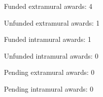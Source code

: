 \begin{veryTightItemize}
    \item Funded extramural awards: 4
    \item Unfunded extramural awards: 1
    \item Funded intramural awards: 1
    \item Unfunded intramural awards: 0
    \item Pending extramural awards: 0
    \item Pending intramural awards: 0
\end{veryTightItemize}
